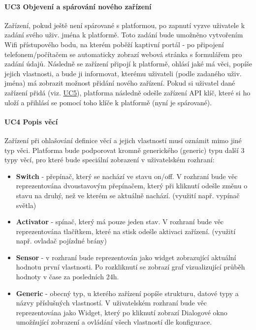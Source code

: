 \paragraph{UC3 Objevení a spárování nového zařízení}
Zařízení, pokud ještě není spárované s platformou, po zapnutí vyzve uživatele k zadání svého uživ. jména k platformě. Toto zadání bude umožněno vytvořením Wifi přístupového bodu, na kterém poběží kaptivní portál - po připojení telefonem/počítačem se automaticky zobrazí webová stránka s formulářem pro zadání údajů. Následně se zařízení připojí k platformě, ohlásí jaké má věci, popíše jejich vlastnosti, a bude ji informovat, kterému uživateli (podle zadaného uživ. jména) má zobrazit možnost přidání nového zařízení. Pokud si uživatel dané zařízení přidá (viz. \hyperref[UC5]{UC5}), platforma následně odešle zařízení API klíč, které si ho uloží a přihlásí se pomocí toho klíče k platformě (nyní je spárované).

\paragraph{UC4 Popis věcí}
Zařízení při ohlašování definice věcí a jejich vlastností musí oznámit mimo jiné typ věci. Platforma bude podporovat kromně generického (generic) typu další 3 typy věcí, pro které bude speciální zobrazení v uživatelském rozhraní:
\begin{itemize}
    \item \textbf{Switch} - přepínač, který se nachází ve stavu on/off. V rozhraní bude věc reprezentována dvoustavovým přepínačem, který při kliknutí odešle změnu o stavu na druhý, než ve kterém se aktuálně nachází. (využití např. vypínač světla)
    \item \textbf{Activator} - spínač, který má pouze jeden stav. V rozhraní bude věc reprezentována tlačítkem, které na stisk odešle aktivaci zařízení. (využití např. ovladač pojízdné brány)
    \item \textbf{Sensor} - v rozhraní bude reprezentován jako widget zobrazující aktuální hodnotu první vlastnosti. Po rozkliknutí se zobrazí graf vizualizující průběh hodnoty v čase za posledních 24h.
    \item \textbf{Generic} - obecný typ, u kterého zařízení popíše strukturu, datové typy a názvy příslušných vlastností. V uživatelském rozhraní bude věc reprezentována jako Widget, který po kliknutí zobrazí Dialogové okno umožňující zobrazení a ovládání všech vlastností dle konfigurace.
\end{itemize}

